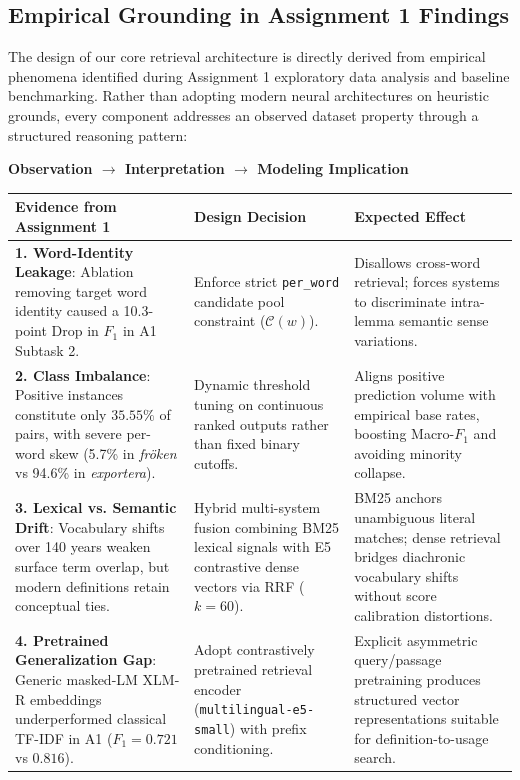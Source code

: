 \subsection{Empirical Grounding in Assignment 1 Findings}
The design of our core retrieval architecture is directly derived from empirical phenomena identified during Assignment 1 exploratory data analysis and baseline benchmarking. Rather than adopting modern neural architectures on heuristic grounds, every component addresses an observed dataset property through a structured reasoning pattern:
\begin{center}
\textbf{Observation $\longrightarrow$ Interpretation $\longrightarrow$ Modeling Implication}
\end{center}

\begin{table}[H]
\centering
\small
\begin{tabular}{p{4.2cm}p{4.6cm}p{5.8cm}}
\toprule
\textbf{Evidence from Assignment 1} & \textbf{Design Decision} & \textbf{Expected Effect} \\
\midrule
\textbf{1. Word-Identity Leakage}: Ablation removing target word identity caused a 10.3-point Drop in $F_1$ in A1 Subtask 2. & Enforce strict \texttt{per\_word} candidate pool constraint ($\mathcal{C}(w)$). & Disallows cross-word retrieval; forces systems to discriminate intra-lemma semantic sense variations. \\
\addlinespace
\textbf{2. Class Imbalance}: Positive instances constitute only $35.55\%$ of pairs, with severe per-word skew (5.7\% in \textit{fr\"oken} vs 94.6\% in \textit{exportera}). & Dynamic threshold tuning on continuous ranked outputs rather than fixed binary cutoffs. & Aligns positive prediction volume with empirical base rates, boosting Macro-$F_1$ and avoiding minority collapse. \\
\addlinespace
\textbf{3. Lexical vs. Semantic Drift}: Vocabulary shifts over 140 years weaken surface term overlap, but modern definitions retain conceptual ties. & Hybrid multi-system fusion combining BM25 lexical signals with E5 contrastive dense vectors via RRF ($k=60$). & BM25 anchors unambiguous literal matches; dense retrieval bridges diachronic vocabulary shifts without score calibration distortions. \\
\addlinespace
\textbf{4. Pretrained Generalization Gap}: Generic masked-LM XLM-R embeddings underperformed classical TF-IDF in A1 ($F_1 = 0.721$ vs $0.816$). & Adopt contrastively pretrained retrieval encoder (\texttt{multilingual-e5-small}) with prefix conditioning. & Explicit asymmetric query/passage pretraining produces structured vector representations suitable for definition-to-usage search. \\

\end{tabular}
\end{table}
